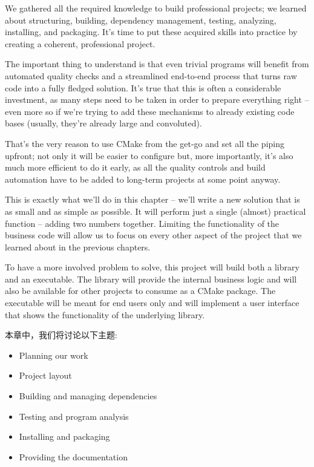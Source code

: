 
We gathered all the required knowledge to build professional projects; we learned about structuring, building, dependency management, testing, analyzing, installing, and packaging. It's time to put these acquired skills into practice by creating a coherent, professional project.

The important thing to understand is that even trivial programs will benefit from automated quality checks and a streamlined end-to-end process that turns raw code into a fully fledged solution. It's true that this is often a considerable investment, as many steps need to be taken in order to prepare everything right – even more so if we're trying to add these mechanisms to already existing code bases (usually, they're already large and convoluted).

That's the very reason to use CMake from the get-go and set all the piping upfront; not only it will be easier to configure but, more importantly, it's also much more efficient to do it early, as all the quality controls and build automation have to be added to long-term projects at some point anyway.

This is exactly what we'll do in this chapter – we'll write a new solution that is as small and as simple as possible. It will perform just a single (almost) practical function – adding two numbers together. Limiting the functionality of the business code will allow us to focus on every other aspect of the project that we learned about in the previous chapters.

To have a more involved problem to solve, this project will build both a library and an executable. The library will provide the internal business logic and will also be available for other projects to consume as a CMake package. The executable will be meant for end users only and will implement a user interface that shows the functionality of the underlying library.

本章中，我们将讨论以下主题:

\begin{itemize}
\item 
Planning our work

\item 
Project layout

\item 
Building and managing dependencies

\item 
Testing and program analysis

\item 
Installing and packaging

\item 
Providing the documentation
\end{itemize}